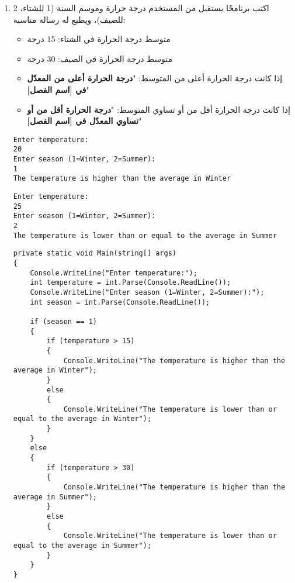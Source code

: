 \documentclass[12pt]{article}
\begin{document}
\begin{enumerate}[itemsep=3em]
\begin{enumerate}[itemsep=3em]
\begin{enumerate}
\item
اكتب برنامجًا يستقبل من المستخدم درجة حرارة وموسم السنة (1 للشتاء، 2 للصيف)، ويطبع له رسالة مناسبة:
\begin{itemize}
\item متوسط درجة الحرارة في الشتاء: 15 درجة
\item متوسط درجة الحرارة في الصيف: 30 درجة
\item إذا كانت درجة الحرارة أعلى من المتوسط: "\textbf{درجة الحرارة أعلى من المعدّل في [اسم الفصل]}"
\item إذا كانت درجة الحرارة أقل من أو تساوي المتوسط: "\textbf{درجة الحرارة أقل من أو تساوي المعدّل في [اسم الفصل]}"
\end{itemize}
\ifdetailed
\begin{example}[1]
\begin{english}
\begin{lstlisting}
Enter temperature:
20
Enter season (1=Winter, 2=Summer):
1
The temperature is higher than the average in Winter
\end{lstlisting}
\end{english}
\end{example}
\begin{example}[2]
\begin{english}
\begin{lstlisting}
Enter temperature:
25
Enter season (1=Winter, 2=Summer):
2
The temperature is lower than or equal to the average in Summer
\end{lstlisting}
\end{english}
\end{example}

\ifwithsols
\begin{solution}
\begin{english}
\begin{lstlisting}
private static void Main(string[] args)
{
    Console.WriteLine("Enter temperature:");
    int temperature = int.Parse(Console.ReadLine());
    Console.WriteLine("Enter season (1=Winter, 2=Summer):");
    int season = int.Parse(Console.ReadLine());

    if (season == 1)
    {
        if (temperature > 15)
        {
            Console.WriteLine("The temperature is higher than the average in Winter");
        }
        else
        {
            Console.WriteLine("The temperature is lower than or equal to the average in Winter");
        }
    }
    else
    {
        if (temperature > 30)
        {
            Console.WriteLine("The temperature is higher than the average in Summer");
        }
        else
        {
            Console.WriteLine("The temperature is lower than or equal to the average in Summer");
        }
    }
}
\end{lstlisting}
\end{english}
\end{solution}
\clearpage
\fi
\fi


\end{enumerate}
\end{enumerate}
\end{enumerate}
\end{document}
